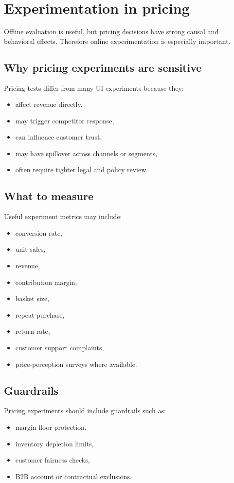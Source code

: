 \section{Experimentation in pricing}
Offline evaluation is useful, but pricing decisions have strong causal and behavioral effects.
Therefore online experimentation is especially important.

\subsection{Why pricing experiments are sensitive}
Pricing tests differ from many UI experiments because they:
\begin{itemize}
  \item affect revenue directly,
  \item may trigger competitor response,
  \item can influence customer trust,
  \item may have spillover across channels or segments,
  \item often require tighter legal and policy review.
\end{itemize}

\subsection{What to measure}
Useful experiment metrics may include:
\begin{itemize}
  \item conversion rate,
  \item unit sales,
  \item revenue,
  \item contribution margin,
  \item basket size,
  \item repeat purchase,
  \item return rate,
  \item customer support complaints,
  \item price-perception surveys where available.
\end{itemize}

\subsection{Guardrails}
Pricing experiments should include guardrails such as:
\begin{itemize}
  \item margin floor protection,
  \item inventory depletion limits,
  \item customer fairness checks,
  \item B2B account or contractual exclusions.
\end{itemize}

